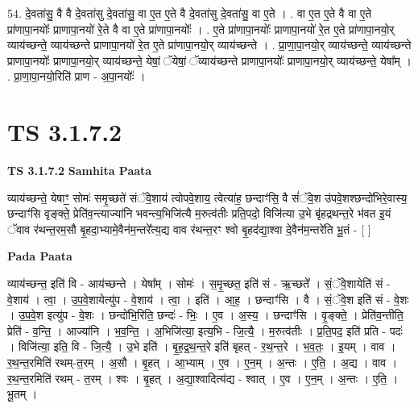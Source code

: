 \documentclass[17pt]{extarticle}
\begin{document}
54. दे॒वता॑सु॒ वै वै दे॒वता॑सु दे॒वता॑सु॒ वा ए॒त ए॒ते वै दे॒वता॑सु दे॒वता॑सु॒ वा ए॒ते । . वा ए॒त ए॒ते वै वा ए॒ते प्रा॑णापा॒नयोः᳚ प्राणापा॒नयो॑ रे॒ते वै वा ए॒ते प्रा॑णापा॒नयोः᳚ । . ए॒ते प्रा॑णापा॒नयोः᳚ प्राणापा॒नयो॑ रे॒त ए॒ते प्रा॑णापा॒नयो॒र् व्याय॑च्छन्ते॒ व्याय॑च्छन्ते प्राणापा॒नयो॑ रे॒त ए॒ते प्रा॑णापा॒नयो॒र् व्याय॑च्छन्ते । . प्रा॒णा॒पा॒नयो॒र् व्याय॑च्छन्ते॒ व्याय॑च्छन्ते प्राणापा॒नयोः᳚ प्राणापा॒नयो॒र् व्याय॑च्छन्ते॒ येषां॒ ॅयेषां॒ ॅव्याय॑च्छन्ते प्राणापा॒नयोः᳚ प्राणापा॒नयो॒र् व्याय॑च्छन्ते॒ येषा᳚म् । . प्रा॒णा॒पा॒नयो॒रिति॑ प्राण - अ॒पा॒नयोः᳚ । \newline
\pagebreak
{}

\section{ TS 3.1.7.2 }

\textbf{TS 3.1.7.2 } \newline
\textbf{Samhita Paata} \newline

व्याय॑च्छन्ते॒ येषाꣳ॒॒ सोमः॑ समृ॒च्छते॑ संॅवे॒शाय॑ त्वोपवे॒शाय॒ त्वेत्या॑ह॒ छन्दाꣳ॑सि॒ वै सं॑ॅवे॒श उ॑पवे॒शश्छन्दो॑भिरे॒वास्य॒ छन्दाꣳ॑सि वृङ्क्ते॒ प्रेति॑व॒न्त्याज्या॑नि भवन्त्य॒भिजि॑त्यै म॒रुत्व॑तीः प्रति॒पदो॒ विजि॑त्या उ॒भे बृ॑हद्रथन्त॒रे भ॑वत इ॒यं ॅवाव र॑थन्त॒रम॒सौ बृ॒हदा॒भ्यामे॒वैन॑म॒न्तरे᳚त्य॒द्य वाव र॑थन्त॒रꣳ श्वो बृ॒हद॑द्या॒श्वा दे॒वैन॑म॒न्तरे॑ति भू॒तं - [  ] \newline

\textbf{Pada Paata} \newline

व्याय॑च्छन्त॒ इति॑ वि - आय॑च्छन्ते । येषा᳚म् । सोमः॑ । स॒मृ॒च्छत॒ इति॑ सं - ऋ॒च्छते᳚ । सं॒ॅवे॒शायेति॑ सं - वे॒शाय॑ । त्वा॒ । उ॒प॒वे॒शायेत्यु॑प - वे॒शाय॑ । त्वा॒ । इति॑ । आ॒ह॒ । छन्दाꣳ॑सि । वै । सं॒ॅवे॒श इति॑ सं - वे॒शः । उ॒प॒वे॒श इत्यु॑प - वे॒शः । छन्दो॑भि॒रिति॒ छन्दः॑ - भिः॒ । ए॒व । अ॒स्य॒ । छन्दाꣳ॑सि । वृ॒ङ्क्ते॒ । प्रेति॑व॒न्तीति॒ प्रेति॑ - व॒न्ति॒ । आज्या॑नि । भ॒व॒न्ति॒ । अ॒भिजि॑त्या॒ इत्य॒भि - जि॒त्यै॒ । म॒रुत्व॑तीः । प्र॒ति॒पद॒ इति॑ प्रति - पदः॑ । विजि॑त्या॒ इति॒ वि - जि॒त्यै॒ । उ॒भे इति॑ । बृ॒ह॒द्र॒थ॒न्त॒रे इति॑ बृहत् - र॒थ॒न्त॒रे । भ॒व॒तः॒ । इ॒यम् । वाव । र॒थ॒न्त॒रमिति॑ रथम्-त॒रम् । अ॒सौ । बृ॒हत् । आ॒भ्याम् । ए॒व । ए॒न॒म् । अ॒न्तः । ए॒ति॒ । अ॒द्य । वाव । र॒थ॒न्त॒रमिति॑ रथम् - त॒रम् । श्वः । बृ॒हत् । अ॒द्या॒श्वादित्य॑द्य - श्वात् । ए॒व । ए॒न॒म् । अ॒न्तः । ए॒ति॒ । भू॒तम् ।  \newline
\end{document}
